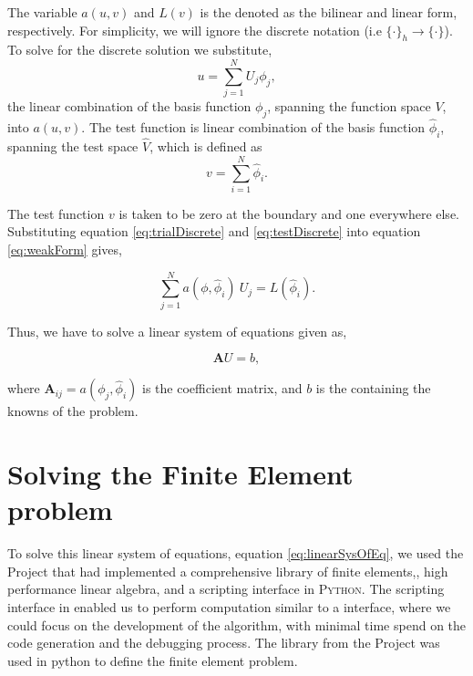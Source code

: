 The variable $a(u,v)$ and $L(v)$ is the denoted as the bilinear and linear form, respectively. For simplicity, we will ignore the discrete notation (i.e $\{\cdot\}_h \rightarrow \{\cdot\}$). To solve for the discrete solution we substitute,	
	\begin{equation}
	u = \sum_{j=1}^{N} U_j \phi_j,
	\label{eq:trialDiscrete}
	\end{equation}
the linear combination of the basis function $\phi_j$, spanning the function space $V$, into $a\left(u,v\right)$. The test function is linear combination of the basis function $\hat{\phi}_i$, spanning the test space $\hat{V}$, which is defined as
	\begin{equation}
	v=\sum_{i=1}^{N} \hat{\phi}_i.
	\label{eq:testDiscrete}
	\end{equation}
	
The test function $v$ is taken to be zero at the boundary and one everywhere else. Substituting equation \ref{eq:trialDiscrete} and \ref{eq:testDiscrete} into equation \ref{eq:weakForm} gives,
	
	\begin{equation}
	\sum_{j=1}^N a(\phi,\hat{\phi}_i)\ U_j = L(\hat{\phi}_i).
	\end{equation}

Thus, we have to solve a linear system of equations given as,

	\begin{equation}
	\mathbf{A}U = b,
	\label{eq:linearSysOfEq}
	\end{equation}	
	
where $\mathbf{A}_{ij} = a(\phi_j,\hat{\phi}_i)$ is the coefficient matrix, and $b$ is the  containing the knowns of the problem.
 	
\section{Solving the Finite Element problem}

To solve this linear system of equations, equation \ref{eq:linearSysOfEq}, we used the \fenics Project that had implemented a comprehensive library of finite elements,, high performance linear algebra, and a scripting interface in \textsc{Python}. The scripting interface in \python enabled us to perform computation similar to a \matlab interface, where we could focus on the development of the algorithm, with minimal time spend on the code generation and the debugging process. The \dolfin library from the \fenics Project was used in python to define the finite element problem. 

